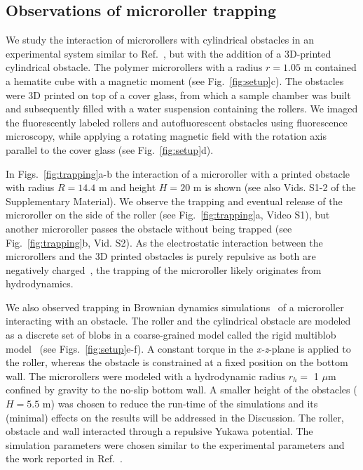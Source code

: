 \documentclass[12pt]{article}
\begin{document}
\subsection*{Observations of microroller trapping}
We study the interaction of microrollers with cylindrical obstacles in an experimental system similar to Ref.~\cite{sprinkle2020active}, but with the addition of a 3D-printed cylindrical obstacle. The polymer microrollers with a radius $r = 1.05$ \textmu m contained a hematite cube with a magnetic moment (see Fig.~\ref{fig:setup}c). The obstacles were 3D printed on top of a cover glass, from which a sample chamber was built and subsequently filled with a water suspension containing the rollers. We imaged the fluorescently labeled rollers and autofluorescent obstacles using fluorescence microscopy, while applying a rotating magnetic field with the rotation axis parallel to the cover glass (see Fig.~\ref{fig:setup}d).

In Figs.~\ref{fig:trapping}a-b the interaction of a microroller with a printed obstacle with radius $R = 14.4$ \textmu m and height $H = 20$ \textmu m is shown (see also Vids. S1-2 of the Supplementary Material). We observe the trapping and eventual release of the microroller on the side of the roller (see Fig.~\ref{fig:trapping}a, Video S1), but another microroller passes the obstacle without being trapped (see Fig.~\ref{fig:trapping}b, Vid. S2).
As the electrostatic interaction between the microrollers and the 3D printed obstacles is purely repulsive as both are negatively charged~\cite{van2017preparation,baker2019shape}, the trapping of the microroller likely originates from hydrodynamics.

We also observed trapping in Brownian dynamics simulations~\cite{sprinkle2017large} of a microroller interacting with an obstacle. The roller and the cylindrical obstacle are modeled as a discrete set of blobs in a coarse-grained model called the rigid multiblob model~\cite{balboa2017hydrodynamics,sprinkle2017large,RigidMultiblobs} (see Figs.~\ref{fig:setup}e-f). A constant torque in the \textit{x-z}-plane is applied to the roller, whereas the obstacle is constrained at a fixed position on the bottom wall.
The microrollers were modeled with a hydrodynamic radius $r_h = $ 1 $\mu$m\cite{geometric} confined by gravity to the no-slip bottom wall. A smaller height of the obstacles ($H = 5.5$ \textmu m) was chosen to reduce the run-time of the simulations and its (minimal) effects on the results will be addressed in the Discussion. The roller, obstacle and wall interacted through a repulsive Yukawa potential. The simulation parameters were chosen similar to the experimental parameters and the work reported in Ref.~\cite{sprinkle2020active}.
\end{document}

